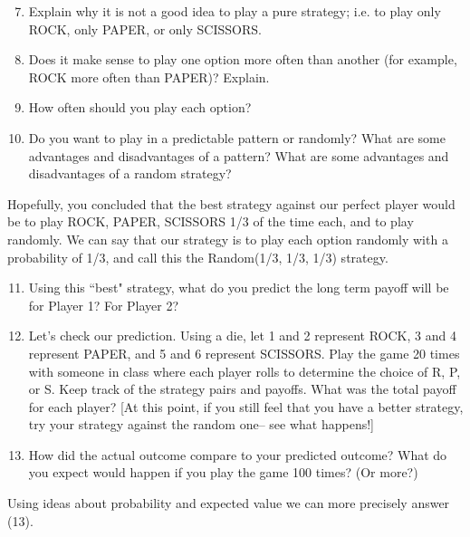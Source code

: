 \begin{enumerate}
\setcounter{enumi}{6}

\item Explain why it is not a good idea to play a pure strategy; i.e. to play only ROCK, only PAPER, or only SCISSORS.
\vspace{.1in}

\item Does it make sense to play one option more often than another (for example, ROCK more often than PAPER)? Explain.
\vspace{.1in}

\item How often should you play each option?
\vspace{.1in}

\item Do you want to play in a predictable pattern or randomly?  What are some advantages and disadvantages of a pattern? What are some advantages and disadvantages of a random strategy?
\vspace{.1in}

\end{enumerate}

Hopefully, you concluded that the best strategy against our perfect player would be to play ROCK, PAPER, SCISSORS 1/3 of the time each, and to play randomly. We can say that our strategy is to play each option randomly with a probability of 1/3, and call this the Random(1/3, 1/3, 1/3) strategy.

\begin{enumerate}
\setcounter{enumi}{10}

\item Using this ``best" strategy, what do you predict the long term payoff will be for Player 1? For Player 2?
\vspace{.1in}

\item Let's check our prediction. Using a die, let 1 and 2 represent ROCK, 3 and 4 represent PAPER, and 5 and 6 represent SCISSORS. Play the game 20 times with someone in class where each player rolls to determine the choice of R, P, or S. Keep track of the strategy pairs and payoffs. What was the total payoff for each player? [At this point, if you still feel that you have a better strategy, try your strategy against the random one-- see what happens!]\vspace{.1in}

\item How did the actual outcome compare to your predicted outcome? What do you expect would happen if you play the game 100 times? (Or more?) 


\vspace{.1in}

\end{enumerate}
\noindent
Using ideas about probability and expected value we can more precisely answer (13).

